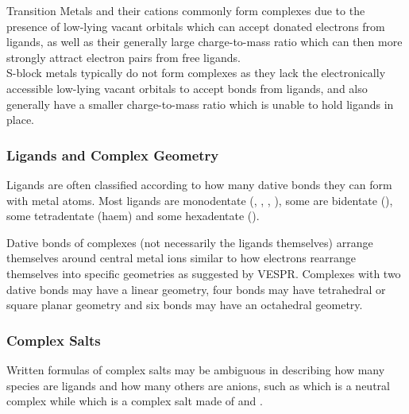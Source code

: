 \documentclass[../main]{subfiles}
\begin{document}
	Transition Metals and their cations commonly form complexes due to the presence of low-lying vacant orbitals which can accept donated electrons from ligands,  as well as their generally large charge-to-mass ratio which can then more strongly attract electron pairs from free ligands. \\

	S-block metals typically do not form complexes as they lack the electronically accessible low-lying vacant orbitals to accept bonds from ligands, and also generally have a smaller charge-to-mass ratio which is unable to hold ligands in place.

	\subsubsection{Ligands and Complex Geometry}

	Ligands are often classified according to how many dative bonds they can form with metal atoms. Most ligands are monodentate (, , , ), some are bidentate (), some tetradentate (haem) and some hexadentate (). \\


	Dative bonds of complexes (not necessarily the ligands themselves) arrange themselves around central metal ions similar to how electrons rearrange themselves into specific geometries as suggested by VESPR. Complexes with two dative bonds may have a linear geometry, four bonds may have tetrahedral or square planar geometry and six bonds may have an octahedral geometry. \\

	\subsubsection{Complex Salts}


	Written formulas of complex salts may be ambiguous in describing how many species are ligands and how many others are anions, such as  which is a neutral complex while  which is a complex salt made of  and . \\
\end{document}
